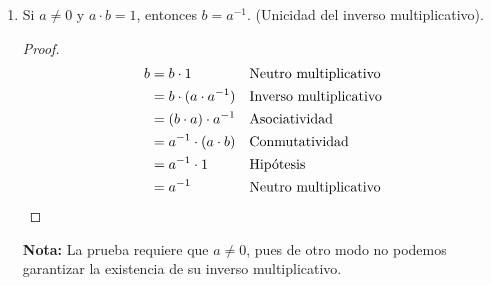 \documentclass[11pt]{article}
\begin{document}
\begin{enumerate}[label=\alph*)]
 \item Si $a\neq 0$ y $a\cdot b =1$, entonces $b=a^{-1}$. (Unicidad del inverso multiplicativo).
 \begin{proof} 
 \begin{align*}
  b &= b \cdot 1 && \text{Neutro multiplicativo}\\
  &= b \cdot (a\cdot a^{-1}) && \text{Inverso multiplicativo}\\
  &= (b\cdot a) \cdot a^{-1} && \text{Asociatividad}\\
  &= a^{-1} \cdot (a\cdot b) && \text{Conmutatividad}\\
  &= a^{-1} \cdot 1 && \text{Hipótesis}\\
  &= a^{-1} && \text{Neutro multiplicativo} \qedhere
 \end{align*} 
 \end{proof}
 \textbf{Nota:} La prueba requiere que $a\neq 0$, pues de otro modo no podemos garantizar la existencia de su inverso multiplicativo.
 

\end{enumerate}
\end{document}
